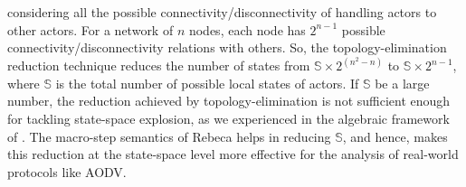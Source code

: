 considering all the possible connectivity/disconnectivity of handling actors to other actors. For a network of $n$ nodes, each node has $2^{n-1}$ possible connectivity/disconnectivity relations with others. So, the topology-elimination reduction technique reduces the number of states from $\mathbb{S}\times 2^{(n^2-n)}$ to $\mathbb{S}\times2^{n-1}$, where $\mathbb{S}$ is the total number of possible local states of actors. If $\mathbb{S}$ be a large number, the reduction achieved by topology-elimination is not sufficient enough for tackling state-space explosion, as we experienced in the algebraic framework of \cite{FORM}. 
The macro-step semantics of Rebeca helps in reducing $\mathbb{S}$, and hence, makes this reduction at the state-space level more effective for the analysis of real-world protocols like AODV. %




